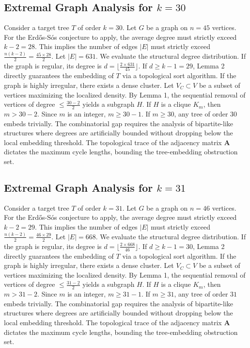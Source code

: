 \documentclass[11pt,a4paper]{article}
\begin{document}
\subsection{Extremal Graph Analysis for $k=30$}
Consider a target tree $T$ of order $k=30$.
Let $G$ be a graph on $n=45$ vertices.
For the Erd\H{o}s-S\'os conjecture to apply, the average degree must strictly exceed $k-2 = 28$.
This implies the number of edges $|E|$ must strictly exceed $\frac{n(k-2)}{2} = \frac{45 \times 28}{2}$.
Let $|E| = 631$.
We evaluate the structural degree distribution. If the graph is regular, its degree is $d = \lfloor \frac{2 \times 631}{45} \rfloor$.
If $d \geq k-1 = 29$, Lemma 2 directly guarantees the embedding of $T$ via a topological sort algorithm.
If the graph is highly irregular, there exists a dense cluster. Let $V_C \subset V$ be a subset of vertices maximizing the localized density.
By Lemma 1, the sequential removal of vertices of degree $\leq \frac{30-2}{2}$ yields a subgraph $H$.
If $H$ is a clique $K_{m}$, then $m > 30-2$. Since $m$ is an integer, $m \geq 30-1$. If $m \geq 30$, any tree of order $30$ embeds trivially.
The combinatorial gap requires the analysis of bipartite-like structures where degrees are artificially bounded without dropping below the local embedding threshold. The topological trace of the adjacency matrix $\mathbf{A}$ dictates the maximum cycle lengths, bounding the tree-embedding obstruction set.


\subsection{Extremal Graph Analysis for $k=31$}
Consider a target tree $T$ of order $k=31$.
Let $G$ be a graph on $n=46$ vertices.
For the Erd\H{o}s-S\'os conjecture to apply, the average degree must strictly exceed $k-2 = 29$.
This implies the number of edges $|E|$ must strictly exceed $\frac{n(k-2)}{2} = \frac{46 \times 29}{2}$.
Let $|E| = 668$.
We evaluate the structural degree distribution. If the graph is regular, its degree is $d = \lfloor \frac{2 \times 668}{46} \rfloor$.
If $d \geq k-1 = 30$, Lemma 2 directly guarantees the embedding of $T$ via a topological sort algorithm.
If the graph is highly irregular, there exists a dense cluster. Let $V_C \subset V$ be a subset of vertices maximizing the localized density.
By Lemma 1, the sequential removal of vertices of degree $\leq \frac{31-2}{2}$ yields a subgraph $H$.
If $H$ is a clique $K_{m}$, then $m > 31-2$. Since $m$ is an integer, $m \geq 31-1$. If $m \geq 31$, any tree of order $31$ embeds trivially.
The combinatorial gap requires the analysis of bipartite-like structures where degrees are artificially bounded without dropping below the local embedding threshold. The topological trace of the adjacency matrix $\mathbf{A}$ dictates the maximum cycle lengths, bounding the tree-embedding obstruction set.
\end{document}

